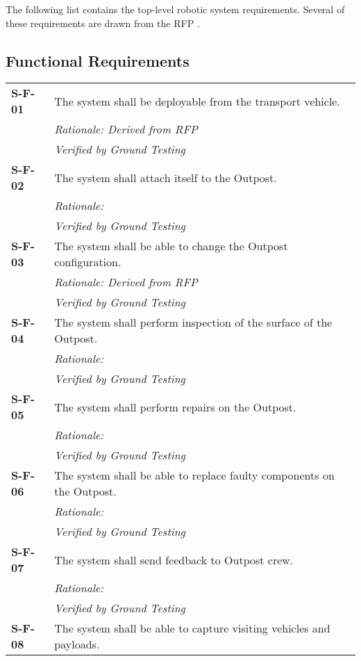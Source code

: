 The following list contains the top-level robotic system requirements. Several of these requirements are drawn from the \gls{RFP} \cite{RFP}. 
\subsection{Functional Requirements}
\begin{longtable}{P{1.5cm}P{14.25cm}}
\vspace{-15pt}
\textbf{S-F-01}	& The system shall be deployable from the transport vehicle. \\
& \textit{Rationale: Derived from \gls{RFP}}	\\
& \textit{Verified by Ground Testing}	\\
\textbf{S-F-02}	& The system shall attach itself to the Outpost. \\
& \textit{Rationale: }	\\
& \textit{Verified by Ground Testing}	\\
\textbf{S-F-03}	& The system shall be able to change the Outpost configuration. \\
& \textit{Rationale: Derived from \gls{RFP}}	\\
& \textit{Verified by Ground Testing}	\\
\textbf{S-F-04}	& The system shall perform inspection of the surface of the Outpost.\\
& \textit{Rationale: }	\\
& \textit{Verified by Ground Testing}	\\
\textbf{S-F-05}	& The system shall perform repairs on the Outpost. \\
& \textit{Rationale: }	\\
& \textit{Verified by Ground Testing}	\\
\textbf{S-F-06}	& The system shall be able to replace faulty components on the Outpost. \\
& \textit{Rationale: }	\\
& \textit{Verified by Ground Testing}	\\
\textbf{S-F-07}	& The system shall send feedback to Outpost crew. \\
& \textit{Rationale: }	\\
& \textit{Verified by Ground Testing}	\\
\textbf{S-F-08}	& The system shall be able to capture visiting vehicles and payloads. \\

\end{longtable}
